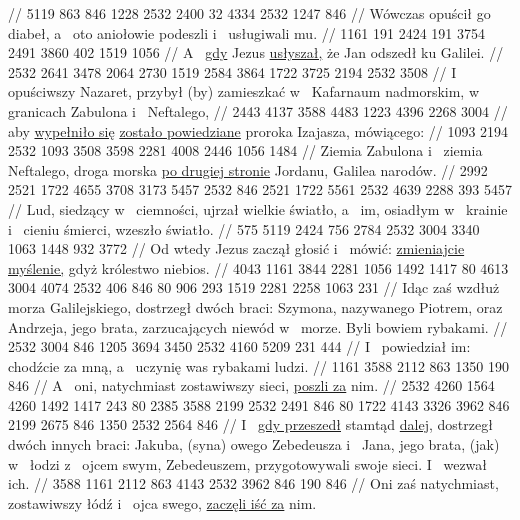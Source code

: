 //
\endgl
\begingl
\gla
{} 5119 863 846 1228 2532 2400 32 4334 2532 1247 846
//
\glb
{} Wówczas opuścił go diabeł, a~ oto aniołowie podeszli i~ usługiwali mu.
//
\endgl
\begingl
\gla
{} 1161 191 2424 191 3754 2491 3860 402 1519 1056
//
\glb
{} A~ \underline{gdy} Jezus \underline{usłyszał,} że Jan  odszedł ku Galilei.
//
\endgl
\begingl
\gla
{} 2532 2641 3478 2064 {} 2730 1519 2584 3864 1722 3725 2194 2532 3508
//
\glb
{} I~ opuściwszy Nazaret, przybył (by) zamieszkać w~ Kafarnaum nadmorskim, w~ granicach Zabulona i~ Neftalego,
//
\endgl
\begingl
\gla
{} 2443 4137 3588 4483 1223 4396 2268 3004
//
\glb
{} aby \underline{wypełniło się}  \underline{zostało powiedziane}  proroka Izajasza, mówiącego:
//
\endgl
\begingl
\gla
{} 1093 2194 2532 1093 3508 3598 2281 4008 2446 1056 1484
//
\glb
{} Ziemia Zabulona i~ ziemia Neftalego, droga morska \underline{po drugiej stronie} Jordanu, Galilea narodów.
//
\endgl
\begingl
\gla
{} 2992 2521 1722 4655 3708 3173 5457 2532 846 2521 1722 5561 2532 4639 2288 393 5457
//
\glb
{} Lud, siedzący w~ ciemności, ujrzał wielkie światło, a~ im, osiadłym w~ krainie i~ cieniu śmierci, wzeszło światło.
//
\endgl
\begingl
\gla
{} 575 5119 2424 756 2784 2532 3004 3340 1063 1448 932 3772
//
\glb
{} Od wtedy Jezus zaczął głosić i~ mówić: \underline{zmieniajcie myślenie,} gdyż  królestwo niebios.
//
\endgl
\begingl
\gla
{} 4043 1161 3844 2281 1056 1492 1417 80 4613 3004 4074 2532 406 846 80 906 293 1519 2281 2258 1063 231
//
\glb
{} Idąc zaś wzdłuż morza Galilejskiego, dostrzegł dwóch braci: Szymona, nazywanego Piotrem, oraz Andrzeja, jego brata, zarzucających niewód w~ morze. Byli bowiem rybakami.
//
\endgl
\begingl
\gla
{} 2532 3004 846 1205 3694 3450 2532 4160 5209 231 444
//
\glb
{} I~ powiedział im: chodźcie za mną, a~ uczynię was rybakami ludzi.
//
\endgl
\begingl
\gla
{} 1161 3588 2112 863 1350 190 846
//
\glb
{} A~ oni, natychmiast zostawiwszy sieci, \underline{poszli za} nim.
//
\endgl
\begingl
\gla
{} 2532 4260 1564 4260 1492 1417 243 80 2385 {} 3588 2199 2532 2491 846 80 {} 1722 4143 3326 3962 846 2199 2675 846 1350 2532 2564 846
//
\glb
{} I~ \underline{gdy przeszedł} stamtąd \underline{dalej,} dostrzegł dwóch innych braci: Jakuba, (syna) owego Zebedeusza i~ Jana, jego brata, (jak) w~ łodzi z~ ojcem swym, Zebedeuszem, przygotowywali swoje sieci. I~ wezwał ich.
//
\endgl
\begingl
\gla
{} 3588 1161 2112 863 4143 2532 3962 846 190 846
//
\glb
{} Oni zaś natychmiast, zostawiwszy łódź i~ ojca swego, \underline{zaczęli iść za} nim.
